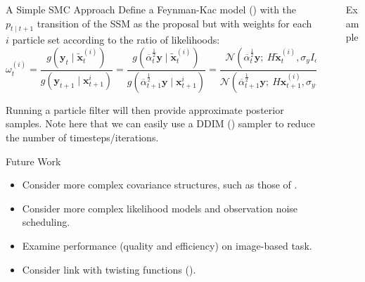 \documentclass[final]{beamer}
\newlength{\sepwidth}
\newlength{\colwidth}
\newcommand{\separatorcolumn}{\begin{column}{\sepwidth}\end{column}}
\begin{document}
\begin{frame}[t]
\begin{columns}[t]
\begin{column}{\colwidth}
\begin{alertblock}{A Simple SMC Approach}
        Define a Feynman-Kac model (\cite{chopinIntroductionSequentialMonte2020}) with the
        $p_{t \mid t+1}$ transition of the SSM as the proposal but with weights for each $i$ particle
        set according to the ratio of likelihoods:
        $$
        \omega_t^{(i)} = \frac{g\left(\mathbf{y}_t \mid \tilde{\mathbf{x}}_t^{(i)}\right)}{g\left(\mathbf{y}_{t+1} \mid \mathbf{x}_{t+1}^{i}\right)}
        = \frac{g\left(\overline{\alpha}_t^{\frac{1}{2}} \mathbf{y} \mid \tilde{\mathbf{x}}_t^{(i)}\right)}{g\left(\overline{\alpha}_{t+1}^{\frac{1}{2}} \mathbf{y} \mid \mathbf{x}_{t+1}^{i}\right)}
        = \frac{\mathcal{N}\left(\overline{\alpha}_t^{\frac{1}{2}} \mathbf{y};\ H\tilde{\mathbf{x}}_t^{(i)}, \sigma_y I_{d_y}\right)}{\mathcal{N}\left(\overline{\alpha}_{t+1}^{\frac{1}{2}} \mathbf{y};\ H\mathbf{x}_{t+1}^{(i)}, \sigma_y I_{d_y}\right)}
        $$

        Running a particle filter will then provide approximate posterior samples. Note here that we can easily use
        a DDIM (\cite{songDenoisingDiffusionImplicit2020}) sampler to reduce the number of timesteps/iterations.
    \end{alertblock}

    \begin{block}{Future Work}
        \begin{itemize}
            \item Consider more complex covariance structures, such as those of \cite{cardosoMonteCarloGuided2023}.
            \item Consider more complex likelihood models and observation noise scheduling.
            \item Examine performance (quality and efficiency) on image-based task.
            \item Consider link with twisting functions (\cite{wuPracticalAsymptoticallyExact2023}).
        \end{itemize}
    \end{block}

\end{column}

\separatorcolumn

\begin{column}{\colwidth}

    \begin{exampleblock}{Example}
    

\end{exampleblock}
\end{column}
\end{columns}
\end{frame}
\end{document}
